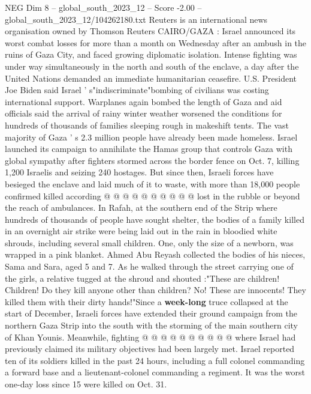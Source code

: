 \begin{textsample}{NEG Dim 8 – global\_south\_2023\_12 – Score -2.00 – global\_south\_2023\_12/104262180.txt}  \label{ex:f8_neg_011}
Reuters is an international news organisation owned by Thomson Reuters CAIRO/GAZA : Israel announced its worst combat losses for more than a month on Wednesday after an ambush in the ruins of Gaza City, and faced growing diplomatic isolation.
Intense fighting was under way simultaneously in the north and south of the enclave, a day after the United Nations demanded an immediate humanitarian ceasefire.
U.S.
President Joe Biden said Israel ' s"indiscriminate"bombing of civilians was costing international support.
Warplanes again bombed the length of Gaza and aid officials said the arrival of rainy winter weather worsened the conditions for hundreds of thousands of families sleeping rough in makeshift tents.
The vast majority of Gaza ' s 2.3 million people have already been made homeless.
Israel launched its campaign to annihilate the Hamas group that controls Gaza with global sympathy after fighters stormed across the border fence on Oct. 7, killing 1,200 Israelis and seizing 240 hostages.
But since then, Israeli forces have besieged the enclave and laid much of it to waste, with more than 18,000 people confirmed killed according @ @ @ @ @ @ @ @ @ @ lost in the rubble or beyond the reach of ambulances.
In Rafah, at the southern end of the Strip where hundreds of thousands of people have sought shelter, the bodies of a family killed in an overnight air strike were being laid out in the rain in bloodied white shrouds, including several small children.
One, only the size of a newborn, was wrapped in a pink blanket.
Ahmed Abu Reyash collected the bodies of his nieces, Sama and Sara, aged 5 and 7.
As he walked through the street carrying one of the girls, a relative tugged at the shroud and shouted :"These are children!
Children!
Do they kill anyone other than children?
No!
These are innocents!
They killed them with their dirty hands!"Since a \textbf{week-long} truce collapsed at the start of December, Israeli forces have extended their ground campaign from the northern Gaza Strip into the south with the storming of the main southern city of Khan Younis.
Meanwhile, fighting @ @ @ @ @ @ @ @ @ @ where Israel had previously claimed its military objectives had been largely met.
Israel reported ten of its soldiers killed in the past 24 hours, including a full colonel commanding a forward base and a lieutenant-colonel commanding a regiment.
It was the worst one-day loss since 15 were killed on Oct. 31.

\end{textsample}
